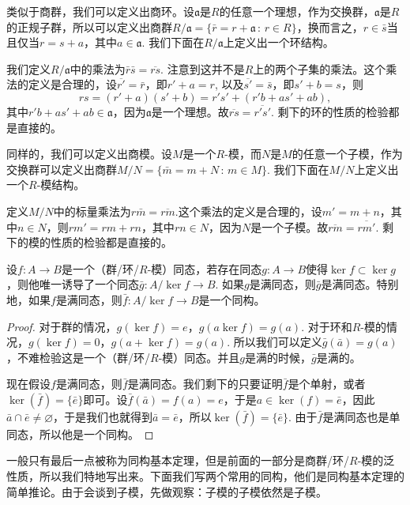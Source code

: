 \para[商环] 类似于商群，我们可以定义出商环。设$\mathfrak{a}$是$R$的任意一个理想，作为交换群，$\mathfrak{a}$是$R$的正规子群，所以可以定义出商群$R/\mathfrak{a}=\{\bar{r}=r+\mathfrak{a}\,:\, r\in R\}$，换而言之，$r\in \bar{s}$当且仅当$r=s+a$，其中$a\in \mathfrak{a}$. 我们下面在$R/\mathfrak{a}$上定义出一个环结构。

我们定义$R/\mathfrak{a}$中的乘法为$\bar{r}\bar{s}=\overline{rs}$. 注意到这并不是$R$上的两个子集的乘法。这个乘法的定义是合理的，设$\overline{r'}=\bar{r}$，即$r'+a=r$, 以及$\overline{s'}=\bar{s}$，即$s'+b =s$，则
\[
	rs=(r'+a)(s'+b)=r's'+(r'b+as'+ab),
\]
其中$r'b+as'+ab\in \mathfrak{a}$，因为$\mathfrak{a}$是一个理想。故$\overline{rs}=\overline{r's'}$. 剩下的环的性质的检验都是直接的。

\para[商模] 同样的，我们可以定义出商模。设$M$是一个$R$-模，而$N$是$M$的任意一个子模，作为交换群可以定义出商群$M/N=\{\bar{m}=m+N\,:\, m\in M\}$. 我们下面在$M/N$上定义出一个$R$-模结构。

定义$M/N$中的标量乘法为$r\bar{m}=\overline{rm}$.这个乘法的定义是合理的，设$m'=m+n$，其中$n\in N$，则$rm'=rm+rn$，其中$rn\in N$，因为$N$是一个子模。故$\overline{rm}=\overline{rm'}$. 剩下的模的性质的检验都是直接的。

\begin{thm}[同构基本定理]
设$f:A\to B$是一个（群/环/$R$-模）同态，若存在同态$g: A\to B$使得$\ker f\subset \ker g$，则他唯一诱导了一个同态$\bar{g}:A/\ker{f}\to B$. 如果$g$是满同态，则$\bar{g}$是满同态。特别地，如果$f$是满同态，则$\bar{f}: A/\ker{f}\to B$是一个同构。
\end{thm}

\begin{proof}
	对于群的情况，$g(\ker f)=e$，$g(a\ker f)=g(a)$. 对于环和$R$-模的情况，$g(\ker f)=0$，$g(a+\ker f)=g(a)$. 所以我们可以定义$\bar{g}(\bar{a})=g(a)$，不难检验这是一个（群/环/$R$-模）同态。并且$g$是满的时候，$\bar{g}$是满的。

	现在假设$f$是满同态，则$\bar{f}$是满同态。我们剩下的只要证明$\bar{f}$是个单射，或者$\ker(\bar{f})=\{\bar{e}\}$即可。设$\bar{f}(\bar{a})=f(a)=e$，于是$a\in \ker(f)=\bar{e}$，因此$\bar{a}\cap \bar{e}\neq\varnothing$，于是我们也就得到$\bar{a}=\bar{e}$，所以$\ker(\bar{f})=\{\bar{e}\}$. 由于$\bar{f}$是满同态也是单同态，所以他是一个同构。
\end{proof}

一般只有最后一点被称为同构基本定理，但是前面的一部分是商群/环/$R$-模的泛性质，所以我们特地写出来。下面我们写两个常用的同构，他们是同构基本定理的简单推论。由于会谈到子模，先做观察：子模的子模依然是子模。

